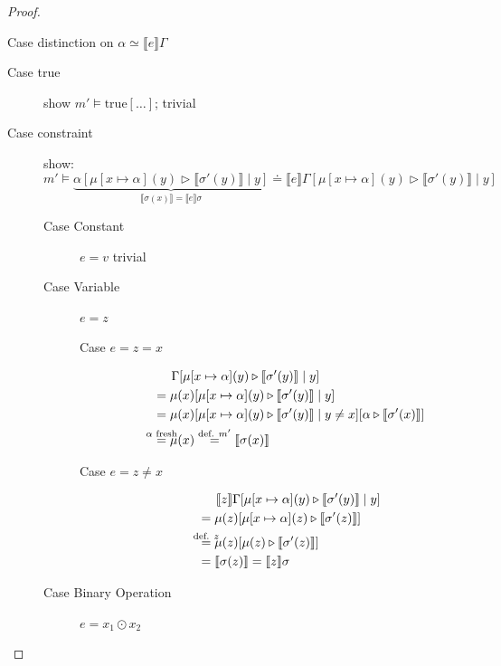 \documentclass[twoside, english]{sdqthesis}
\newcommand{\bbracket}[1]{\llbracket #1 \rrbracket}
\newcommand{\tr}[0]{\triangleright}
\theoremstyle{definition}
\begin{document}
\begin{proof}
\begin{description}
      Case distinction on $\alpha \simeq \bbracket{e}\Gamma$

      \begin{description}
        \item[Case true] show $m' \vDash \text{true}[\dots]$; trivial
        \item[Case constraint] show:
          $$ m' \vDash 
            \underbrace{\alpha[\mu[x\mapsto \alpha](y) \tr \bbracket{\sigma'(y)} \mid y]}_{\bbracket{\sigma(x)}=\bbracket{e}\sigma}
            \doteq 
            \bbracket{e}\Gamma[\mu[x\mapsto \alpha](y) \tr \bbracket{\sigma'(y)} \mid y]
          $$
          \begin{description}
            \item[Case Constant] $e=v$ trivial
            \item[Case Variable] $e=z$
              \begin{description}
                \item[Case $e=z=x$] 
                  \begin{align*}
                    &\phantom{=}\ \ \Gamma[\mu[x\mapsto \alpha](y) \tr \bbracket{\sigma'(y)} \mid y]
                    \\ &= \mu(x)[\mu[x\mapsto \alpha](y) \tr \bbracket{\sigma'(y)} \mid y]
                    \\ &= \mu(x)[\mu[x\mapsto \alpha](y) \tr \bbracket{\sigma'(y)} \mid y \neq x][\alpha \tr \bbracket{\sigma'(x)} ]
                    \\ &\overset{\mathclap{\alpha \text{ fresh}}}{=} \mu(x) 
                      \overset{\text{def. } m'}{=} \bbracket{\sigma(x)}
                  \end{align*}
                \item[Case $e = z \neq x$]
                  \begin{align*}
                    &\phantom{=}\ \ \bbracket{z}\Gamma[\mu[x\mapsto \alpha](y) \tr \bbracket{\sigma'(y)} \mid y]
                    \\ &= \mu(z)[\mu[x\mapsto \alpha](z) \tr \bbracket{\sigma'(z)}]
                    \\ &\overset{\mathclap{\text{def. } z}}{=} \mu(z)[\mu(z) \tr \bbracket{\sigma'(z)}]
                    \\ &=\bbracket{\sigma(z)} = \bbracket{z}\sigma
                  \end{align*}
              \end{description}
            \item[Case Binary Operation] $e = x_1 \odot x_2$

\end{description}
\end{description}
\end{description}
\end{proof}
\end{document}
